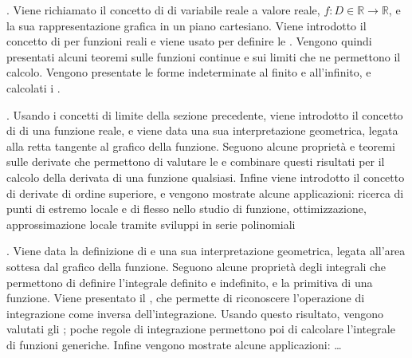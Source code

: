 \documentclass[letterpaper,10pt,italian]{jupyterBook}
\begin{document}
\sphinxAtStartPar
{\hyperref[\detokenize{ch/infinitesimal_calculus/analysis:infinitesimal-calculus-analysis}]{}}. Viene richiamato il concetto di  di variabile reale a valore reale, \(f: D \in \mathbb{R} \rightarrow \mathbb{R}\), e la sua rappresentazione grafica in un piano cartesiano. 
Viene introdotto il concetto di  per funzioni reali e viene usato per definire le . Vengono quindi presentati alcuni teoremi sulle funzioni continue e sui limiti che ne permettono il calcolo. Vengono presentate le forme indeterminate al finito e all’infinito, e calcolati i .

\sphinxAtStartPar
{\hyperref[\detokenize{ch/infinitesimal_calculus/derivatives:infinitesimal-calculus-derivatives}]{}}. Usando i concetti di limite della sezione precedente, viene introdotto il concetto di  di una funzione reale, e viene data una sua interpretazione geometrica, legata alla retta tangente al grafico della funzione. Seguono alcune proprietà e teoremi sulle derivate che permettono di valutare le  e combinare questi risultati per il calcolo della derivata di una funzione qualsiasi. Infine viene introdotto il concetto di derivate di ordine superiore, e vengono mostrate alcune applicazioni: ricerca di punti di estremo locale e di flesso nello studio di funzione, ottimizzazione, approssimazione locale tramite sviluppi in serie polinomiali

\sphinxAtStartPar
{\hyperref[\detokenize{ch/infinitesimal_calculus/integrals:infinitesimal-calculus-integrals}]{}}. Viene data la definizione di  e una sua interpretazione geometrica, legata all’area sottesa dal grafico della funzione. Seguono alcune proprietà degli integrali che permettono di definire l’integrale definito e indefinito, e la primitiva di una funzione. Viene presentato il , che permette di riconoscere l’operazione di integrazione come inversa dell’integrazione. Usando questo risultato, vengono valutati gli ; poche regole di integrazione permettono poi di calcolare l’integrale di funzioni generiche. Infine vengono mostrate alcune applicazioni: … 
\end{document}

